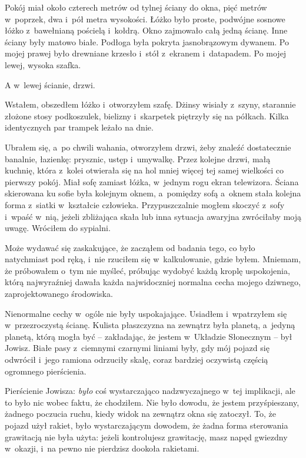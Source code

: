 \documentclass[oneside,polish,11pt,sfheadings]{mwbk}
\begin{document}
Pokój miał około czterech metrów od tylnej ściany do okna, pięć metrów w~poprzek, dwa i~pół metra wysokości. Łóżko było proste, podwójne sosnowe
łóżko z~bawełnianą pościelą i~kołdrą. Okno zajmowało całą jedną ścianę.
Inne ściany były matowo białe. Podłoga była pokryta jasnobrązowym
dywanem. Po mojej prawej było drewniane krzesło i~stół z~ekranem i~datapadem. Po mojej lewej, wysoka szafka.

A w~lewej ścianie, drzwi.

Wstałem, obszedłem łóżko i~otworzyłem szafę. Dżinsy wisiały z~szyny,
starannie złożone stosy podkoszulek, bielizny i~skarpetek piętrzyły się
na półkach. Kilka identycznych par trampek leżało na dnie.

Ubrałem się, a~po chwili wahania, otworzyłem drzwi, żeby znaleźć
dostatecznie banalnie, łazienkę: prysznic, ustęp i~umywalkę. Przez
kolejne drzwi, małą kuchnię, która z~kolei otwierała się na hol mniej
więcej tej samej wielkości co pierwszy pokój. Miał sofę zamiast łóżka, w~jednym rogu ekran telewizora. Ściana skierowana ku sofie była kolejnym
oknem, a~pomiędzy sofą a~oknem stała kolejna forma z~siatki w~kształcie
człowieka. Przypuszczalnie mogłem skoczyć z~sofy i~wpaść w~nią, jeżeli
zbliżająca skała lub inna sytuacja awaryjna zwróciłaby moją uwagę.
Wróciłem do sypialni.

Może wydawać się zaskakujące, że zacząłem od badania tego, co było
natychmiast pod ręką, i~nie rzuciłem się w~kalkulowanie, gdzie byłem.
Mniemam, że próbowałem o~tym nie myśleć, próbując wydobyć każdą kroplę
uspokojenia, którą najwyraźniej dawała każda najwidoczniej normalna
cecha mojego dziwnego, zaprojektowanego środowiska.

Nienormalne cechy w~ogóle nie były uspokajające. Usiadłem i~wpatrzyłem
się w~przezroczystą ścianę. Kulista płaszczyzna na zewnątrz była
planetą, a~jedyną planetą, którą mogła być -- zakładając, że jestem w~Układzie Słonecznym -- był Jowisz. Białe pasy z~ciemnymi czarnymi liniami
były, gdy mój pojazd się odwrócił i~jego ramiona odrzuciły skalę, coraz
bardziej oczywistą częścią ogromnego pierścienia.

Pierścienie Jowisza: \emph{było} coś wystarczająco nadzwyczajnego w~tej
implikacji, ale to było nic wobec faktu, że chodziłem. Nie było dowodu,
że jestem przyśpieszany, żadnego poczucia ruchu, kiedy widok na zewnątrz
okna się zatoczył. To, że pojazd użył rakiet, było wystarczającym
dowodem, że żadna forma sterowania grawitacją nie była użyta: jeżeli
kontrolujesz grawitację, masz napęd gwiezdny w~okazji, i~na pewno nie
pierdzisz dookoła rakietami.
\end{document}
